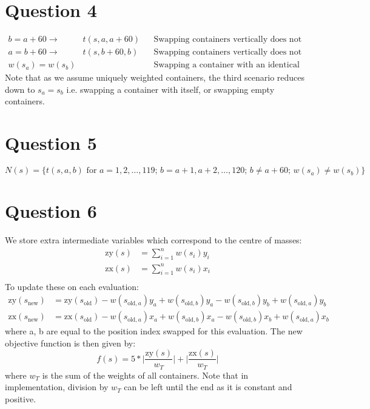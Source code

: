 \documentclass[10pt,a4paper]{article}
\begin{document}
\section*{Question 4}
\begin{align*}
b = a + 60\longrightarrow &t(s, a, a + 60) && \text{Swapping containers vertically does not change anything} \\
a = b + 60\longrightarrow &t(s, b + 60, b) && \text{Swapping containers vertically does not change anything} \\
w(s_a) = w(s_b) & && \text{Swapping a container with an identical container does nothing}
\end{align*}
Note that as we assume uniquely weighted containers, the third scenario reduces down to \(s_a = s_b\) i.e. swapping a container with itself, or swapping empty containers.

\section*{Question 5}
\begin{equation*}
N(s) = \bigg\{t(s,a,b) \text{ for } a=1,2,\dots,119; \, b=a+1,a+2,\dots,120; \, b \neq a+60; \, w(s_a) \neq w(s_b)\bigg\}
\end{equation*}

\section*{Question 6}
We store extra intermediate variables which correspond to the centre of masses:
\begin{align*}
\text{zy}(s) &= \sum^n_{i=1} w(s_i)y_i\\
\text{zx}(s) &= \sum^n_{i=1} w(s_i)x_i\\
\end{align*}
To update these on each evaluation:
\begin{align*}
\text{zy}(s_\text{new}) &= \text{zy}(s_\text{old}) - w(s_{\text{old}, a})y_a + w(s_{\text{old}, b})y_a - w(s_{\text{old}, b})y_b + w(s_{\text{old}, a})y_b \\
\text{zx}(s_\text{new}) &= \text{zx}(s_\text{old}) - w(s_{\text{old}, a})x_a + w(s_{\text{old}, b})x_a - w(s_{\text{old}, b})x_b + w(s_{\text{old}, a})x_b
\end{align*}
where a, b are equal to the position index swapped for this evaluation. The new objective function is then given by:
\begin{equation*}
f(s) = 5 * \bigg| \frac{\text{zy}(s)}{w_T} \bigg| + \bigg| \frac{\text{zx}(s)}{w_T} \bigg|
\end{equation*}
where \(w_T\) is the sum of the weights of all containers. Note that in implementation, division by \(w_T\) can be left until the end as it is constant and positive.
\end{document}
